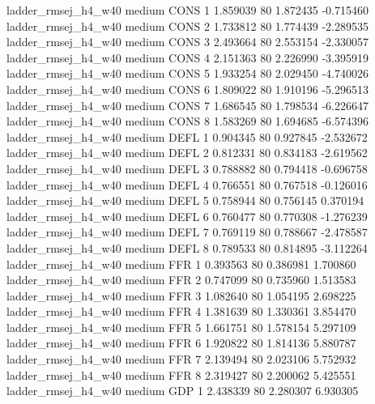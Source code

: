 ladder_rmsej_h4_w40     medium     CONS                 1  1.859039 80       1.872435          -0.715460
ladder_rmsej_h4_w40     medium     CONS                 2  1.733812 80       1.774439          -2.289535
ladder_rmsej_h4_w40     medium     CONS                 3  2.493664 80       2.553154          -2.330057
ladder_rmsej_h4_w40     medium     CONS                 4  2.151363 80       2.226990          -3.395919
ladder_rmsej_h4_w40     medium     CONS                 5  1.933254 80       2.029450          -4.740026
ladder_rmsej_h4_w40     medium     CONS                 6  1.809022 80       1.910196          -5.296513
ladder_rmsej_h4_w40     medium     CONS                 7  1.686545 80       1.798534          -6.226647
ladder_rmsej_h4_w40     medium     CONS                 8  1.583269 80       1.694685          -6.574396
ladder_rmsej_h4_w40     medium     DEFL                 1  0.904345 80       0.927845          -2.532672
ladder_rmsej_h4_w40     medium     DEFL                 2  0.812331 80       0.834183          -2.619562
ladder_rmsej_h4_w40     medium     DEFL                 3  0.788882 80       0.794418          -0.696758
ladder_rmsej_h4_w40     medium     DEFL                 4  0.766551 80       0.767518          -0.126016
ladder_rmsej_h4_w40     medium     DEFL                 5  0.758944 80       0.756145           0.370194
ladder_rmsej_h4_w40     medium     DEFL                 6  0.760477 80       0.770308          -1.276239
ladder_rmsej_h4_w40     medium     DEFL                 7  0.769119 80       0.788667          -2.478587
ladder_rmsej_h4_w40     medium     DEFL                 8  0.789533 80       0.814895          -3.112264
ladder_rmsej_h4_w40     medium      FFR                 1  0.393563 80       0.386981           1.700860
ladder_rmsej_h4_w40     medium      FFR                 2  0.747099 80       0.735960           1.513583
ladder_rmsej_h4_w40     medium      FFR                 3  1.082640 80       1.054195           2.698225
ladder_rmsej_h4_w40     medium      FFR                 4  1.381639 80       1.330361           3.854470
ladder_rmsej_h4_w40     medium      FFR                 5  1.661751 80       1.578154           5.297109
ladder_rmsej_h4_w40     medium      FFR                 6  1.920822 80       1.814136           5.880787
ladder_rmsej_h4_w40     medium      FFR                 7  2.139494 80       2.023106           5.752932
ladder_rmsej_h4_w40     medium      FFR                 8  2.319427 80       2.200062           5.425551
ladder_rmsej_h4_w40     medium      GDP                 1  2.438339 80       2.280307           6.930305
